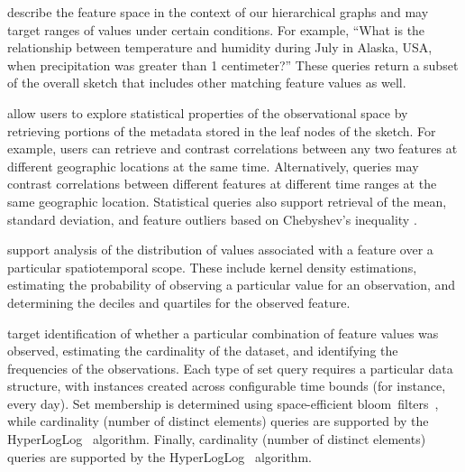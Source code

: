 \begin{description}[leftmargin=*]
    \item[Relational Queries] describe the feature space in the context of our hierarchical graphs and may target ranges of values under certain conditions. For example, ``What is the relationship between temperature and humidity during July in Alaska, USA, when precipitation was greater than 1 centimeter?'' These queries return a subset of the overall sketch that includes other matching feature values as well.\vspace{-0.6em}%

    \item[Statistical Queries] allow users to explore statistical properties of the observational space by retrieving portions of the metadata stored in the leaf nodes of the sketch. For example, users can retrieve and contrast correlations between any two features at different geographic locations at the same time. Alternatively, queries may contrast correlations between different features at different time ranges at the same geographic location. Statistical queries also support retrieval of the mean, standard deviation, and feature outliers based on Chebyshev's inequality \cite{knuth1968art}.\vspace{-0.6em}

    \item[Density Queries] support analysis of the distribution of values associated with a feature over a particular spatiotemporal scope. These include kernel density estimations, estimating the probability of observing a particular value for an observation, and determining the deciles and quartiles for the observed feature.\vspace{-0.6em}%

    \item[Set Queries] target identification of whether a particular combination of feature values was observed, estimating the cardinality of the dataset, and identifying the frequencies of the observations. Each type of set query requires a particular data structure, with instances created across configurable time bounds (for instance, every day). Set membership is determined using space-efficient bloom~filters~\cite{bloom1970space}, while cardinality (number of distinct elements) queries are supported by the HyperLogLog~\cite{flajolet2007hyperloglog} algorithm. Finally, cardinality (number of distinct elements) queries are supported by the HyperLogLog~\cite{flajolet2007hyperloglog} algorithm.\vspace{-0.6em}


\end{description}
